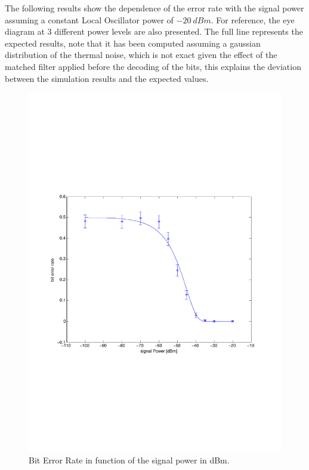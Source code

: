 \documentclass[a4paper]{article}
\begin{document}
The following results show the dependence of the error rate with the signal power assuming a constant Local Oscillator power of $-20~dBm$. For reference, the eye diagram at 3 different power levels are also presented. The full line represents the expected results, note that it has been computed assuming a gaussian distribution of the thermal noise, which is not exact given the effect of the matched filter applied before the decoding of the bits, this explains the deviation between the simulation results and the expected values.

\begin{figure}[H]
\centering
\includegraphics[width=\linewidth, trim= 0mm 85mm 0mm 85mm, clip]{berevolution.pdf}
\caption{Bit Error Rate in function of the signal power in dBm.}
\label{fig:berevolution}
\end{figure}
\end{document}
